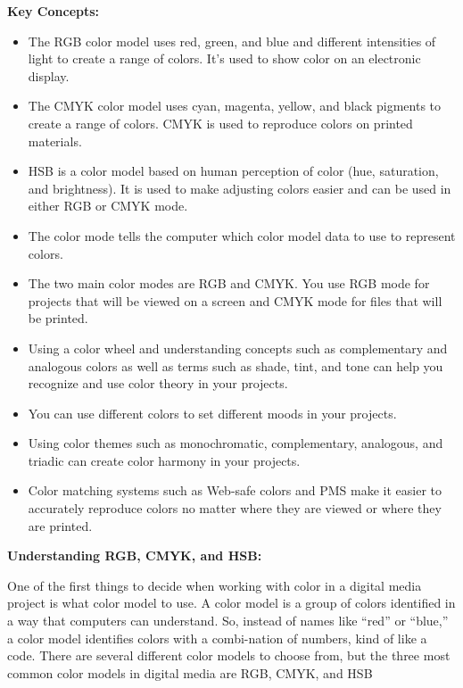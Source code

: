 \documentclass{report}
\begin{document}
         \bigbreak \noindent \bigbreak \noindent
         \begin{Large}
             \noindent \textbf{Key Concepts:}
         \end{Large}
         \bigbreak \noindent
        \begin{itemize}
            \item The RGB color model uses red, green, and blue and different intensities of light to create a range of colors. It’s used to show color on an electronic display. 
            \item The CMYK color model uses cyan, magenta, yellow, and black pigments to create a range of colors. CMYK is used to reproduce colors on printed materials. 
            \item HSB is a color model based on human perception of color (hue, saturation, and brightness). It is used to make adjusting colors easier and can be used in either RGB or CMYK mode. 
            \item The color mode tells the computer which color model data to use to represent  colors.
            \item The two main color modes are RGB and CMYK. You use RGB mode for projects that will be viewed on a screen and CMYK mode for files that will be printed. 
            \item Using a color wheel and understanding concepts such as complementary and analogous colors as well as terms such as shade, tint, and tone can help you recognize and use color theory in your projects. 
            \item You can use different colors to set different moods in your projects. 
            \item Using color themes such as monochromatic, complementary, analogous, and triadic can create color harmony in your projects. 
            \item Color matching systems such as Web-safe colors and PMS make it easier to accurately reproduce colors no matter where they are viewed or where they are printed.
        \end{itemize} 

        \pagebreak \bigbreak \noindent
        \begin{Large}
            \noindent \textbf{Understanding RGB, CMYK,  and HSB:}
        \end{Large}
        \bigbreak \noindent
        One of the first things to decide when working with color in a digital media project is what color model to use. A color model is a group of colors identified in a way that computers can understand. So, instead of names like “red” or “blue,” a color model identifies colors with a combi-nation of numbers, kind of like a code. There are several different color models to choose from, but the three most common color models in digital media are RGB, CMYK, and HSB
        
\end{document}
